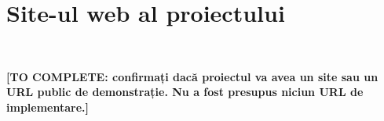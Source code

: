 \chapter*{Site-ul web al proiectului}
~

\textbf{[TO COMPLETE: confirmați dacă proiectul va avea un site sau un URL public de demonstrație. Nu a fost presupus niciun URL de implementare.]}
